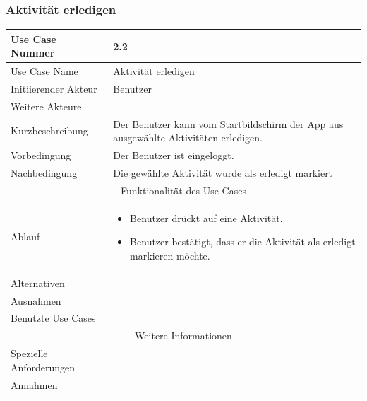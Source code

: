 \documentclass[10pt,a4paper]{article}
\begin{document}
\subsubsection{Aktivit\"at erledigen}
	\begin{tabular}{|l|p{.5\linewidth}|}
	\hline Use Case Nummer & 2.2 \\ 
	\hline Use Case Name & Aktivit\"at erledigen \\ 
	\hline Initiierender Akteur & Benutzer \\
	\hline Weitere Akteure &  \\
	\hline Kurzbeschreibung & Der Benutzer kann vom Startbildschirm der App aus ausgew\"ahlte Aktivit\"aten erledigen. \\
	\hline Vorbedingung & Der Benutzer ist eingeloggt. \\
	\hline Nachbedingung & Die gewählte Aktivit\"at wurde als erledigt markiert \\
	\hline \multicolumn{2}{|c|}{Funktionalität des Use Cases}\\
	\hline Ablauf & \begin{itemize}
		\item Benutzer drückt auf eine Aktivit\"at.
		\item Benutzer best\"atigt, dass er die Aktivit\"at als erledigt markieren möchte.
	\end{itemize} \\
	\hline Alternativen &  \\
	\hline Ausnahmen &  \\
	\hline Benutzte Use Cases &  \\
	\hline \multicolumn{2}{|c|}{Weitere Informationen} \\
	\hline Spezielle Anforderungen &  \\
	\hline Annahmen &  \\
	\hline
	\end{tabular}
\end{document}
